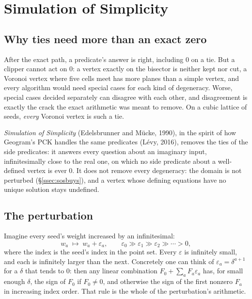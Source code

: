 \documentclass[11pt,a4paper]{article}
\newcommand{\secref}[1]{\S\ref{#1}}
\theoremstyle{definition}
\theoremstyle{remark}
\begin{document}
\section{Simulation of Simplicity}\label{sec:sos}

\subsection{Why ties need more than an exact zero}

After the exact path, a predicate's answer is right, including 0 on a tie. But a clipper cannot
act on 0: a vertex exactly on the bisector is neither kept nor cut, a Voronoi vertex where five
cells meet has more planes than a simple vertex, and every algorithm would need special cases for
each kind of degeneracy. Worse, special cases decided separately can disagree with each other, and
disagreement is exactly the crack the exact arithmetic was meant to remove. On a cubic lattice of
seeds, \emph{every} Voronoi vertex is such a tie.

\emph{Simulation of Simplicity} (Edelsbrunner and M\"ucke, 1990), in the spirit of how Geogram's PCK handles
the same predicates (L\'evy, 2016), removes the ties of the side predicates: it answers every
question about an imaginary input, infinitesimally close to the real one, on which no side
predicate about a well-defined vertex is ever 0. It does not remove every degeneracy: the domain
is not perturbed (\secref{ssec:sosbuys}), and a vertex whose defining equations have no unique
solution stays undefined.

\subsection{The perturbation}

Imagine every seed's weight increased by an infinitesimal:
\[
  w_a \;\longmapsto\; w_a + \varepsilon_a,\qquad
  \varepsilon_0 \gg \varepsilon_1 \gg \varepsilon_2 \gg \cdots > 0,
\]
where the index is the seed's index in the point set. Every $\varepsilon$ is infinitely small, and
each is infinitely larger than the next. Concretely one can think of $\varepsilon_a =
\delta^{a+1}$ for a $\delta$ that tends to 0: then any linear combination
$F_0 + \sum_a F_a\varepsilon_a$ has, for small enough $\delta$, the sign of $F_0$ if $F_0 \ne 0$,
and otherwise the sign of the first nonzero $F_a$ in increasing index order. That rule is the whole
of the perturbation's arithmetic.
\end{document}
